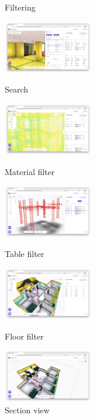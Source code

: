 \begin{itemize}
\begin{itemize}[label=$\star$]
\begin{figure}[!ht]
\begin{fullwidth}
{				      \caption*{Filtering}
			      }\qquad
			      \parbox{0.35\textwidth}{
				      \centering
				      \includegraphics[width=0.35\textwidth]{images/builderhub-curation-filter-search.png}
				      \caption*{Search}
			      }\qquad
			      \parbox{0.35\textwidth}{
				      \centering
				      \includegraphics[width=0.35\textwidth]{images/builderhub-curation-filter-material.png}
				      \caption*{Material filter}
			      }\qquad
			      \parbox{0.35\textwidth}{
				      \centering
				      \includegraphics[width=0.35\textwidth]{images/builderhub-curation-filter-table.png}
				      \caption*{Table filter}
			      }
			      \parbox{0.35\textwidth}{
				      \centering
				      \includegraphics[width=0.35\textwidth]{images/builderhub-curation-filter-floor.png}
				      \caption*{Floor filter}
			      }\qquad
			      \parbox{0.35\textwidth}{
				      \centering
				      \includegraphics[width=0.35\textwidth]{images/builderhub-curation-section-view.png}
				      \caption*{Section view}
}
\end{fullwidth}
\end{figure}
\end{itemize}
\end{itemize}
